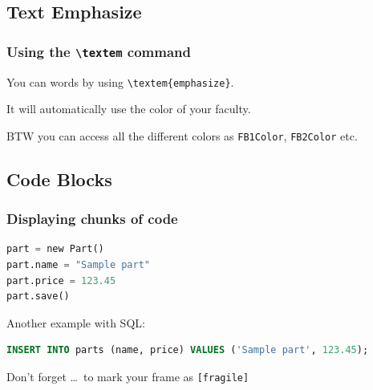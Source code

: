 \documentclass[english]{beamer}
\begin{document}
\subsection{Text Emphasize}

\begin{frame}
 \frametitle{Using the \texttt{\textbackslash textem} command}
You can  words by using \texttt{\textbackslash textem\{emphasize\}}.

It will automatically use the color of your faculty.

\vspace{\baselineskip}
BTW you can access all the different colors as \texttt{FB1Color}, \texttt{FB2Color} etc.
\end{frame}



\subsection{Code Blocks}

\begin{frame}[fragile]
 \frametitle{Displaying chunks of code}

\begin{lstlisting}[language=Python]
part = new Part()
part.name = "Sample part"
part.price = 123.45
part.save()
\end{lstlisting}

Another example with SQL:

\begin{lstlisting}[language=sql]
INSERT INTO parts (name, price) VALUES ('Sample part', 123.45);
\end{lstlisting}

\begin{alertblock}{Don't forget}
  \dots\ to mark your frame as \texttt{[fragile]}
\end{alertblock}
\end{frame}
\end{document}
